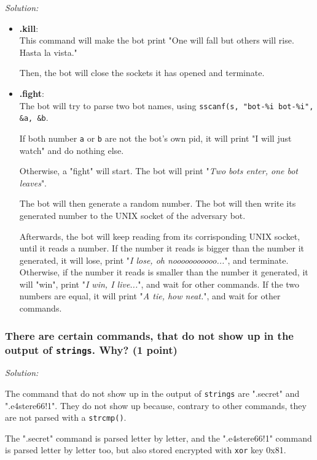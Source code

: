 \documentclass[a4paper,11pt]{article}
\newenvironment{solution}%
{\par{\noindent\small\textit{Solution:}}\vspace{-12pt}\begin{framed}}%
{\end{framed}\par}
\begin{document}
\begin{solution}
\begin{itemize}
		\item \textbf{.kill}:\\
			This command will make the bot print "One will fall but others will rise. Hasta la vista."

			Then, the bot will close the sockets it has opened and terminate.

		\item \textbf{.fight}:\\
			The bot will try to parse two bot names, using \texttt{sscanf(s, "bot-\%i bot-\%i", \&a, \&b}.

			If both number \texttt{a} or \texttt{b} are not the bot's own pid, it will print "I will just watch" 
			and do nothing else.

			Otherwise, a "fight" will start. The bot will print "\textit{Two bots enter, one bot leaves}".

			The bot will then generate a random number. The bot will then write its generated number to the 
			UNIX socket of the adversary bot. 

			Afterwards, the bot will keep reading from its corrisponding UNIX socket, until it reads a number.
			If the number it reads is bigger than the number it generated, it will lose, print
			"\textit{I lose, oh nooooooooooo...}", and terminate.
			Otherwise, if the number it reads is smaller than the number it generated, it will "win",
			print "\textit{I win, I live...}", and wait for other commands.
			If the two numbers are equal, it will print "\textit{A tie, how neat.}", and wait for other commands.




	\end{itemize}
\end{solution}\fi

\subsubsection*{There are certain commands, that do not show up in the output of
\texttt{strings}. Why? \ifsolution (1 point) \fi}
\ifsolution
\begin{solution}
	The command that do not show up in the output of \texttt{strings} are ".secret" and ".e4stere66!1".
	They do not show up because, contrary to other commands, they are not parsed with a \texttt{strcmp()}.

	The ".secret" command is parsed letter by letter, and the ".e4stere66!1" command is parsed letter by 
	letter too, but also stored encrypted with \texttt{xor} key 0x81.
\end{solution}\fi
\end{document}
